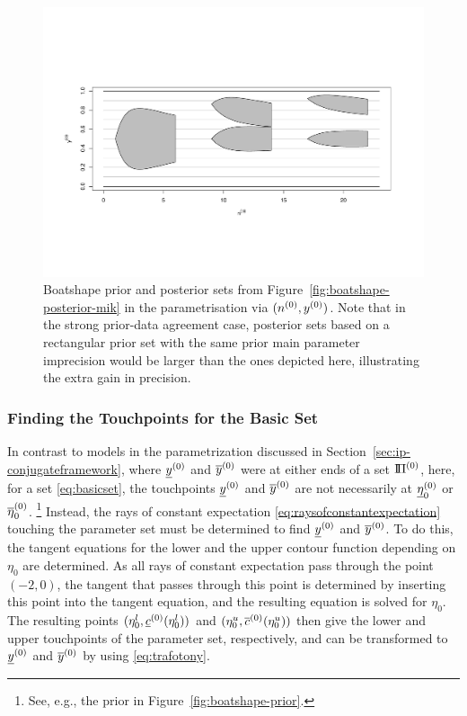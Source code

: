 \begin{figure}  %
\centering
\includegraphics[trim = 15mm 45mm 25mm 60mm, clip, width=\textwidth]{R/boatshape-posterior-normal}%
\caption[Boatshape prior and posterior sets from Figure~\ref{fig:boatshape-posterior-mik} in the parametrisation via $(\nz,\yz)$.]%
{Boatshape prior and posterior sets from Figure~\ref{fig:boatshape-posterior-mik} in the parametrisation via $(\nz,\yz)$.
Note that in the strong prior-data agreement case,
posterior sets based on a rectangular prior set with the same prior main parameter imprecision
would be larger than the ones depicted here, illustrating the extra gain in precision.}
\label{fig:boatshape-posterior-normal}
\end{figure}

\subsubsection{Finding the Touchpoints for the Basic Set}
\label{sec:touchpoints}

In contrast to models in the parametrization discussed in Section~\ref{sec:ip-conjugateframework},
where $\underline{y}^{(0)}$ and $\overline{y}^{(0)}$ were at either ends of a set $\text{I}\!\Pi^{(0)}$,
here, for a set \eqref{eq:basicset}, the touchpoints $\underline{y}^{(0)}$ and $\overline{y}^{(0)}$ 
are not necessarily at $\underline{\eta}_0^{(0)}$ or $\overline{\eta}_0^{(0)}$.%
\footnote{See, e.g., the prior in Figure~\ref{fig:boatshape-prior}.}
Instead, the rays of constant expectation \eqref{eq:raysofconstantexpectation}
touching the parameter set must be determined to find $\underline{y}^{(0)}$ and $\overline{y}^{(0)}$.
To do this, the tangent equations for the lower and the upper contour function
depending on $\eta_0$ are determined.
As all rays of constant expectation pass through the point $(-2,0)$,
the tangent that passes through this point is determined by inserting this point
into the tangent equation, and the resulting equation is solved for $\eta_0$.
The resulting points $(\eta_0^l,\underline{c}^{(0)}(\eta_0^l))$ and $(\eta_0^u,\overline{c}^{(0)}(\eta_0^u))$
then give the lower and upper touchpoints of the parameter set, respectively,
and can be transformed to $\underline{y}^{(0)}$ and $\overline{y}^{(0)}$ by using \eqref{eq:trafotony}.

